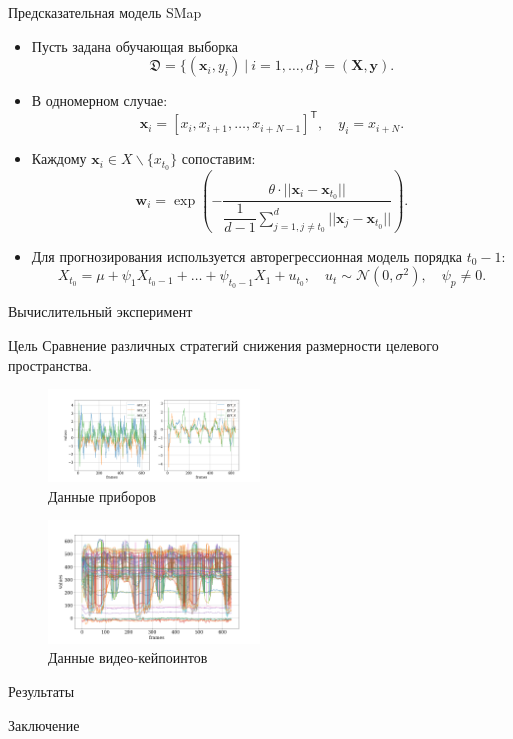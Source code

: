 \documentclass{beamer}
\newcommand{\bx}{\mathbf{x}}
\newcommand{\by}{\mathbf{y}}
\newcommand{\bw}{\mathbf{w}}
\newcommand{\bX}{\mathbf{X}}
\newcommand{\T}{^{\mathsf{T}}}
\begin{document}
	\begin{frame}{Предсказательная модель SMap}
		\begin{itemize}
			\item[\textbullet] Пусть задана обучающая выборка
			\[ \mathfrak{D} = \{ (\bx_i, y_i) \: | \: i = 1, \ldots, d \} = (\bX, \by).\]
			
			\item[\textbullet] В одномерном случае:
			\[ \bx_i = [x_i, x_{i+1}, \ldots, x_{i+N-1}]\T, \quad y_i = x_{i+N}. \]
			
			\item[\textbullet] Каждому $\bx_i \in X \backslash \{ x_{t_0}\}$ сопоставим: \[ \bw_i = \exp \left(-\dfrac{\theta \cdot ||\bx_i - \bx_{t_0}||}{\dfrac{1}{d-1} \sum\limits_{j=1, j \neq t_0}^d ||\bx_j - \bx_{t_0}||} \right). \]
			
			\item[\textbullet]
			Для прогнозирования используется авторегрессионная модель порядка $t_0-1$:
			\[ X_{t_0} = \mu + \psi_1 X_{t_0-1} + \ldots + \psi_{t_0-1} X_1 + u_{t_0}, \quad u_t \sim \mathcal{N}(0, \sigma^2), \quad \psi_p \neq 0.\]
		\end{itemize}
	\end{frame}

	\begin{frame}{Вычислительный эксперимент}
		\begin{alertblock}{Цель}
			Сравнение различных стратегий снижения размерности целевого пространства.
		\end{alertblock}
		
		
		\begin{multicols}{2}
		\begin{figure}
			\includegraphics[width=0.5\textwidth]{cyclic_devices_data.png}
			\caption{Данные приборов}
		\end{figure}
	
		\begin{figure}[bhtp]
			\includegraphics[width=0.5\textwidth]{cyclic_video_data.png}
			\caption{Данные видео-кейпоинтов}
		\end{figure}
		\end{multicols}
		
	\end{frame}

	\begin{frame}{Результаты}
		
	\end{frame}

	\begin{frame}{Заключение}
	
	
	\end{frame}
\end{document}

